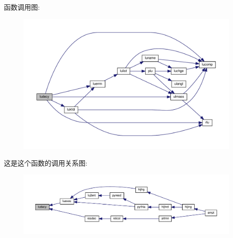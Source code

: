 函数调用图\+:
\nopagebreak
\begin{figure}[H]
\begin{center}
\leavevmode
\includegraphics[width=350pt]{ludecy_8f90_a0e63ac3fb8e174c3bbe8daf1403e40ce_cgraph}
\end{center}
\end{figure}
这是这个函数的调用关系图\+:
\nopagebreak
\begin{figure}[H]
\begin{center}
\leavevmode
\includegraphics[width=350pt]{ludecy_8f90_a0e63ac3fb8e174c3bbe8daf1403e40ce_icgraph}
\end{center}
\end{figure}
